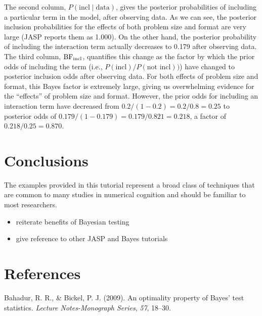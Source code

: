 \documentclass[english,,doc,floatsintext]{apa6}
\providecommand{\tightlist}{%
  \setlength{\itemsep}{0pt}\setlength{\parskip}{0pt}}
\begin{document}
The second column, \(P(\text{incl}\mid\text{data})\), gives the posterior probabilities of including a particular term in the model, after observing data. As we can see, the posterior inclusion probabilities for the effects of both problem size and format are very large (JASP reports them as 1.000). On the other hand, the posterior probability of including the interaction term actually decreases to 0.179 after observing data. The third column, \(\textnormal{BF}_{\text{incl}}\), quantifies this change as the factor by which the prior odds of including the term (i.e., \(P(\text{incl})/P(\text{not incl}))\)) have changed to posterior inclusion odds after observing data. For both effects of problem size and format, this Bayes factor is extremely large, giving us overwhelming evidence for the \enquote{effects} of problem size and format. However, the prior odds for including an interaction term have decreased from \(0.2/(1-0.2) = 0.2/0.8 = 0.25\) to posterior odds of \(0.179/(1-0.179) = 0.179/0.821 = 0.218\), a factor of \(0.218/0.25 = 0.870\).

\hypertarget{conclusions}{%
\section{Conclusions}\label{conclusions}}

The examples provided in this tutorial represent a broad class of techniques that are common to many studies in numerical cognition and should be familiar to most researchers.

\begin{itemize}
\tightlist
\item
  reiterate benefits of Bayesian testing
\item
  give reference to other JASP and Bayes tutorials
\end{itemize}

\newpage

\hypertarget{references}{%
\section{References}\label{references}}

\setlength{\parindent}{-0.5in}
\setlength{\leftskip}{0.5in}

\hypertarget{refs}{}
\leavevmode\hypertarget{ref-bahadur2009optimality}{}%
Bahadur, R. R., \& Bickel, P. J. (2009). An optimality property of Bayes' test statistics. \emph{Lecture Notes-Monograph Series}, \emph{57}, 18--30.
\end{document}
